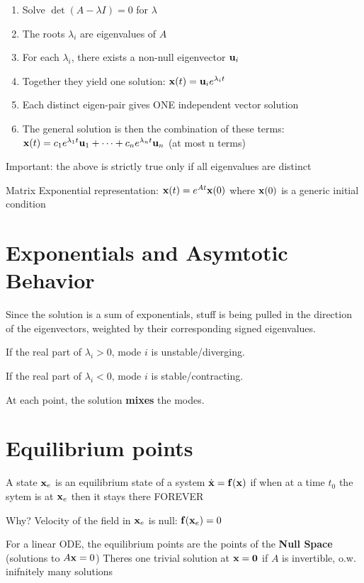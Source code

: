 \documentclass{report}
\begin{document}
\begin{enumerate}
    \item Solve $\det(A - \lambda I) = 0$ for $\lambda$
    \item The roots $\lambda_i$ are eigenvalues of $A$
    \item For each $\lambda_i$, there exists a non-null eigenvector 
    $\mathbf{u}_i$ 
    \item Together they yield one solution: $\mathbf{x}(t) = \mathbf{u}_i e^{\lambda_i t}$
    \item Each distinct eigen-pair gives ONE independent vector solution
    \item The general solution is then the combination of these terms: 
    $\mathbf{x}(t) = c_1 e^{\lambda_1 t} \mathbf{u}_1 + \dots + c_n e^{\lambda_n t} \mathbf{u}_n$ (at most n terms)
\end{enumerate}

Important: the above is strictly true only if all eigenvalues are distinct

Matrix Exponential representation: $\mathbf{x}(t) = e^{A t} \mathbf{x}(0)$ where $\mathbf{x}(0)$ is a generic initial condition

\section*{Exponentials and Asymtotic Behavior}

Since the solution is a sum of exponentials, stuff is being pulled in the direction of the eigenvectors, 
weighted by their corresponding signed eigenvalues.


If the real part of $\lambda_i > 0$, mode $i$ is unstable/diverging.

If the real part of $\lambda_i < 0$, mode $i$ is stable/contracting.

At each point, the solution \textbf{mixes} the modes.

\section*{Equilibrium points}

A state $\mathbf{x}_e$ is an equilibrium state of a system $\dot{\mathbf{x}} = \mathbf{f}(\mathbf{x})$ if 
when at a time $t_0$ the sytem is at $\mathbf{x}_e$ then it stays there FOREVER

Why? Velocity of the field in $\mathbf{x}_e$ is null: $\mathbf{f}(\mathbf{x}_e) = 0$


For a linear ODE, the equilibrium points are the points of the \textbf{Null Space} (solutions to $A \mathbf{x} = 0$)
Theres one trivial solution at $\mathbf{x} = \mathbf{0}$ if $A$ is invertible, o.w. inifnitely many solutions
\end{document}
